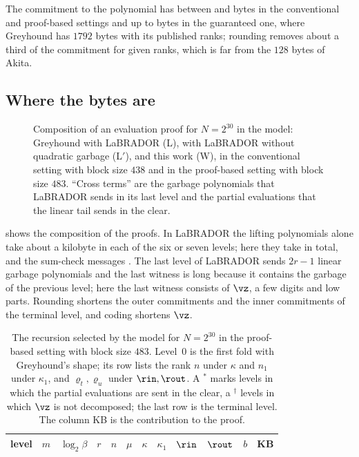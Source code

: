 The commitment to the polynomial has between \nComLo{} and \nComHi{} bytes in the conventional and proof-based settings and up to \nGComHi{} bytes in the guaranteed one, where Greyhound has $1792$ bytes with its published ranks; rounding removes about a third of the commitment for given ranks, which is far from the $128$ bytes of Akita.

\subsection{Where the bytes are}\label{sec:bytes}

\begin{figure}[t]
\centering

\caption{Composition of an evaluation proof for $N=2^{30}$ in the model: Greyhound with LaBRADOR (L), with LaBRADOR without quadratic garbage (L$'$), and this work (W), in the conventional setting with block size $438$ and in the proof-based setting with block size $483$. ``Cross terms'' are the garbage polynomials that LaBRADOR sends in its last level and the partial evaluations that the linear tail sends in the clear.}
\label{fig:bars}
\end{figure}

 shows the composition of the proofs. In LaBRADOR the lifting polynomials alone take about a kilobyte in each of the six or seven levels; here they take \nLiftW\KB{} in total, and the sum-check messages \nScW\KB. The last level of LaBRADOR sends $2r-1$ linear garbage polynomials and the last witness is long because it contains the garbage of the previous level; here the last witness consists of $\vz$, a few digits and low parts. Rounding shortens the outer commitments and the inner commitments of the terminal level, and coding shortens $\vz$.

\begin{table}[t]
\centering\small
\setlength{\tabcolsep}{4.6pt}
\begin{tabular}{@{}crrrrrrrrrrr@{}}
\toprule
level & $m$ & $\log_2\beta$ & $r$ & $n$ & $\mu$ & $\kappa$ & $\kappa_1$ & $\rin$ & $\rout$ & $b$ & KB\\
\midrule

\bottomrule
\end{tabular}
\caption{The recursion selected by the model for $N=2^{30}$ in the proof-based setting with block size $483$. Level~$0$ is the first fold with Greyhound's shape; its row lists the rank $n$ under $\kappa$ and $n_1$ under $\kappa_1$, and $\varrho_t,\varrho_u$ under $\rin,\rout$. A $^*$ marks levels in which the partial evaluations are sent in the clear, a $^\dagger$ levels in which $\vz$ is not decomposed; the last row is the terminal level. The column KB is the contribution to the proof.}
\label{tab:sched}
\end{table}

